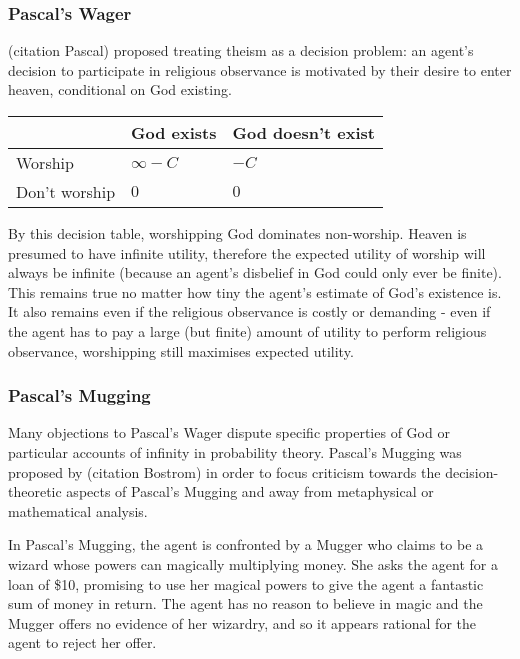 \documentclass{article}
\begin{document}
\subsubsection {Pascal's Wager}

(citation Pascal) proposed treating theism as a decision problem: an agent's decision to participate in religious observance is motivated by their desire to enter heaven, conditional on God existing.

\begin{center}
\begin{tabular}{ | l | l | l |}
  \hline
    & God exists & God doesn't exist \\ \hline
  Worship & \(\infty - C\) & \(- C\) \\ \hline
  Don't worship & \(0\)  & \(0\) \\
  \hline
\end{tabular}
\end{center}

By this decision table, worshipping God dominates non-worship. Heaven is presumed to have infinite utility, therefore the expected utility of worship will always be infinite (because an agent's disbelief in God could only ever be finite). This remains true no matter how tiny the agent's estimate of God's existence is. It also remains even if the religious observance is costly or demanding - even if the agent has to pay a large (but finite) amount of utility to perform religious observance, worshipping still maximises expected utility.

\subsubsection {Pascal's Mugging}
Many objections to Pascal's Wager dispute specific properties of God or  particular accounts of infinity in probability theory. Pascal's Mugging was proposed by (citation Bostrom) in order to focus criticism towards the decision-theoretic aspects of Pascal's Mugging and away from metaphysical or mathematical analysis.

In Pascal's Mugging, the agent is confronted by a Mugger who claims to be a wizard whose powers can magically multiplying money. She asks the agent for a loan of \$10, promising to use her magical powers to give the agent a fantastic sum of money in return. The agent has no reason to believe in magic and the Mugger offers no evidence of her wizardry, and so it appears rational for the agent to reject her offer.
\end{document}
